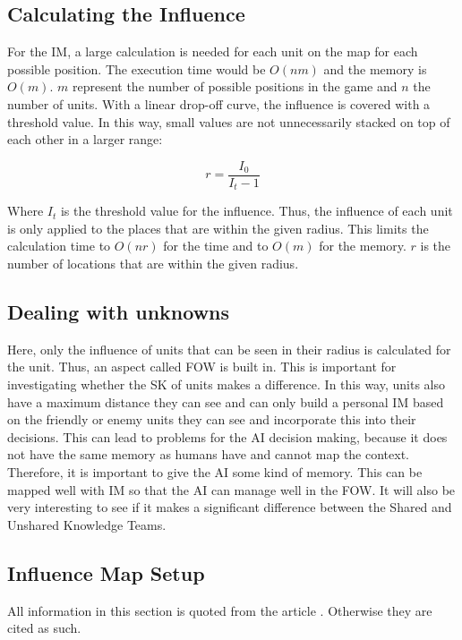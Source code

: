 \documentclass[]{report}
\begin{document}
	\subsection{Calculating the Influence}
	For the \ac{IM}, a large calculation is needed for each unit on the map for each possible position. The execution time would be $O(nm)$ and the memory is $O(m)$. $m$ represent the number of possible positions in the game and $n$ the number of units. With a linear drop-off curve, the influence is covered with a threshold value. In this way, small values are not unnecessarily stacked on top of each other in a larger range:
	
	\begin{equation}
		r = \frac{I_0}{I_t - 1}
	\end{equation}

	Where $I_t$ is the threshold value for the influence. Thus, the influence of each unit is only applied to the places that are within the given radius. This limits the calculation time to $O(nr)$ for the time and to $O(m)$ for the memory. $r$ is the number of locations that are within the given radius.
	
	\subsection{Dealing with unknowns} \label{ssec:dwu}
	Here, only the influence of units that can be seen in their radius is calculated for the unit. Thus, an aspect called \ac{FOW} is built in. This is important for investigating whether the \ac{SK} of units makes a difference. In this way, units also have a maximum distance they can see and can only build a personal \ac{IM} based on the friendly or enemy units they can see and incorporate this into their decisions. This can lead to problems for the \ac{AI} decision making, because it does not have the same memory as humans have and cannot map the context. Therefore, it is important to give the \ac{AI} some kind of memory. This can be mapped well with IM so that the \ac{AI} can manage well in the \ac{FOW}. It will also be very interesting to see if it makes a significant difference between the Shared and Unshared Knowledge Teams.
	
	\subsection{Influence Map Setup}
	All information in this section is quoted from the article \citep{gameDevInfluenceMap}. Otherwise they are cited as such.
	
\end{document}
